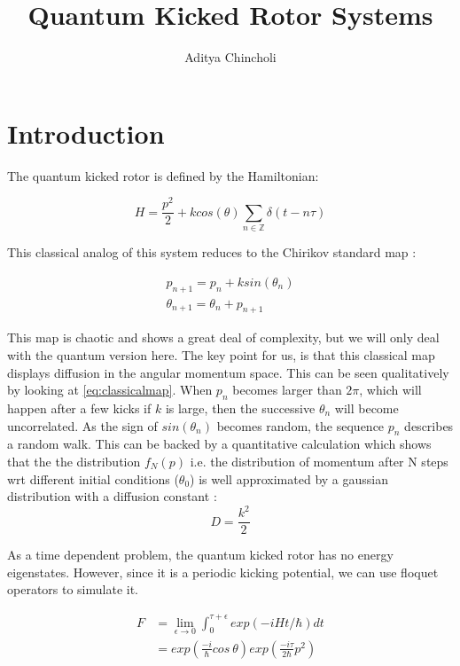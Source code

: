 \documentclass[twocolumn,nobalancelastpage]{report}
\title{Quantum Kicked Rotor Systems}
\author{Aditya Chincholi}
\begin{document}
\maketitle

\onecolumn
\begin{abstract}
\end{abstract}
\twocolumn
\chapter{Introduction}
The quantum kicked rotor is defined by the Hamiltonian:

\begin{equation}
H = \frac{p^2}{2} + k cos(\theta) \sum_{n \in \mathbb{Z}} \delta(t - n\tau)
\end{equation}

This classical analog of this system reduces to the Chirikov standard map
\cite{stockmann}:

\begin{align}
    p_{n+1} = p_n + k sin(\theta_n) \\
    \theta_{n+1} = \theta_n + p_{n+1} \label{eq:classicalmap}
\end{align}

This map is chaotic and shows a great deal of complexity, but we will only
deal with the quantum version here. The key point for us, is that this
classical map displays diffusion in the angular momentum space. This can be
seen qualitatively by looking at \ref{eq:classicalmap}. When $p_n$ becomes
larger than $2\pi$, which will happen after a few kicks if $k$ is large,
then the successive $\theta_n$ will become uncorrelated. As the sign of
$sin(\theta_n)$ becomes random, the sequence ${p_n}$ describes a random walk.
This can be backed by a quantitative calculation which shows that the
the distribution $f_N(p)$ i.e. the distribution of momentum after N steps
wrt different initial conditions ($\theta_0$) is well approximated by a
gaussian distribution with a diffusion constant \cite{stockmann}:
\begin{equation}
    D = \frac{k^2}{2}
\end{equation}

As a time dependent problem, the quantum kicked rotor has no energy eigenstates.
However, since it is a periodic kicking potential, we can use floquet operators
to simulate it.

\begin{align}
    F &= \lim_{\epsilon \to 0} \int_{0}^{\tau + \epsilon} exp(-iHt/\hbar) dt\\
    &= exp\left(\frac{-i}{\hbar} cos\ \theta\right)
    exp\left(\frac{-i\tau}{2\hbar}p^2\right)
\end{align}
\end{document}
